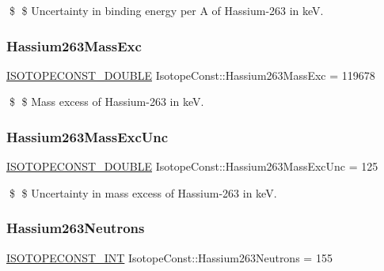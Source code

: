 \$ \$ Uncertainty in binding energy per A of Hassium-\/263 in keV. \mbox{\label{group___isotope_const-_hassium-_hs263_ga5c9b57feb1f4cb9593cb55f68d8af148}} 
\subsubsection{\texorpdfstring{Hassium263\+Mass\+Exc}{Hassium263MassExc}}
{\footnotesize\ttfamily \mbox{\hyperlink{group___isotope_const-_macros_ga8f45a7272ce02c0b4c65c44636ed719a}{I\+S\+O\+T\+O\+P\+E\+C\+O\+N\+S\+T\+\_\+\+D\+O\+U\+B\+LE}} Isotope\+Const\+::\+Hassium263\+Mass\+Exc = 119678}

\$ \$ Mass excess of Hassium-\/263 in keV. \mbox{\label{group___isotope_const-_hassium-_hs263_ga3691aed8879413b523f66595272fd6b4}} 
\subsubsection{\texorpdfstring{Hassium263\+Mass\+Exc\+Unc}{Hassium263MassExcUnc}}
{\footnotesize\ttfamily \mbox{\hyperlink{group___isotope_const-_macros_ga8f45a7272ce02c0b4c65c44636ed719a}{I\+S\+O\+T\+O\+P\+E\+C\+O\+N\+S\+T\+\_\+\+D\+O\+U\+B\+LE}} Isotope\+Const\+::\+Hassium263\+Mass\+Exc\+Unc = 125}

\$ \$ Uncertainty in mass excess of Hassium-\/263 in keV. \mbox{\label{group___isotope_const-_hassium-_hs263_gaaa8dd99dc61436666c6d061ff1b5f5b8}} 
\subsubsection{\texorpdfstring{Hassium263\+Neutrons}{Hassium263Neutrons}}
{\footnotesize\ttfamily \mbox{\hyperlink{group___isotope_const-_macros_ga5f18360b3e99483a35c32d789e62621c}{I\+S\+O\+T\+O\+P\+E\+C\+O\+N\+S\+T\+\_\+\+I\+NT}} Isotope\+Const\+::\+Hassium263\+Neutrons = 155}

